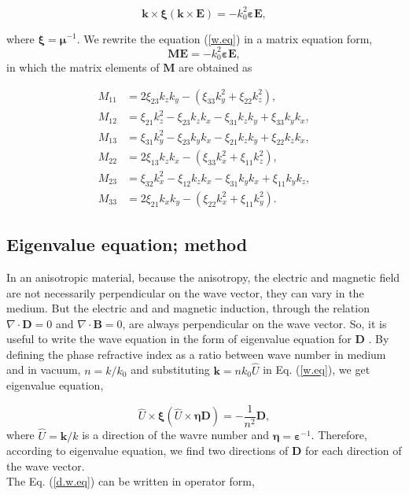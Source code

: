 \documentclass[9pt,twocolumn,twoside]{osajnl}
\begin{document}
   \begin{equation}\label{w.eq}
	\mathbf{k}\times{\boldsymbol{\xi}(\mathbf{k}\times\mathbf{E})}=-k^{2}_{0}\boldsymbol{\varepsilon}\mathbf{E},
\end{equation}

where $\boldsymbol{\xi}=\boldsymbol{\mu}^{-1}$.
We rewrite the equation (\ref{w.eq}) in a matrix equation form, 
\[\mathbf{M}\mathbf{E}=-k_{0}^{2}\boldsymbol{\varepsilon}\mathbf{E}, \] 
in which  the matrix elements of $\mathbf{M}$ are obtained as

\begin{align}
M_{11}&=2\xi_{23}k_{z}k_{y}-(\xi_{33}k_{y}^{2}+\xi_{22}k_{z}^{2}), \nonumber\\
M_{12}&=\xi_{21}k_{z}^{2}-\xi_{23}k_{z}k_{x}-\xi_{31}k_{z}k_{y}+\xi_{33}k_{y}k_{x}, \nonumber\\
M_{13}&=\xi_{31}k_{y}^{2}-\xi_{23}k_{y}k_{x}-\xi_{21}k_{z}k_{y}+\xi_{22}k_{z}k_{x}, \nonumber\\
M_{22}&=2\xi_{13}k_{z}k_{x}-(\xi_{33}k_{x}^{2}+\xi_{11}k_{z}^{2}), \nonumber\\
M_{23}&=\xi_{32}k_{x}^{2}-\xi_{12}k_{z}k_{x}-\xi_{31}k_{y}k_{x}+\xi_{11}k_{y}k_{z},\nonumber\\
M_{33}&=2\xi_{21}k_{x}k_{y}-(\xi_{22}k_{x}^{2}+\xi_{11}k_{y}^{2}).
\end{align}


\subsection{Eigenvalue equation; method}
In an anisotropic material, because the anisotropy, the electric and magnetic field are not necessarily perpendicular on the wave vector, they can vary in the medium.  But the electric and and magnetic induction, through the relation $\nabla\cdot \mathbf{D} =0 $ and $\nabla\cdot \mathbf{B} =0$, are always perpendicular on the wave vector. So, it is useful to write the wave equation in the form of eigenvalue equation for $\mathbf{D}$  \cite{saleh1991fundamentals}. 
By defining the phase refractive index as a ratio between wave number in medium and in vacuum, $n=k/k_{0}$ and substituting $\boldsymbol{k}=nk_{0}\hat{U}$ in Eq. (\ref{w.eq}), we get eigenvalue equation, 

\begin{equation}\label{d.w.eq}
    \hat{U}\times{\boldsymbol{\xi}(\hat{U}\times\boldsymbol{\eta}\mathbf{D})}=-\frac{1}{n^{2}}\mathbf{D},
\end{equation}
where $\hat{U}=\mathbf{k}/k$ is a direction of the wavre number and $\boldsymbol{\eta}=\boldsymbol{\varepsilon}^{-1}$. Therefore, according to eigenvalue equation, we find  two directions of $\mathbf{D}$ for each direction of the wave vector.\\
 The Eq. (\ref{d.w.eq}) can be written in operator form,
\end{document}
